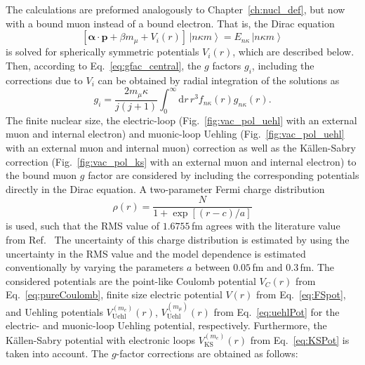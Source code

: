 The calculations are preformed analogously to Chapter~\ref{ch:nucl_def}, but now with a bound muon instead of a bound electron. That is, the Dirac equation
\begin{equation}
\label{eq:boundMuonDirac}
\left[\boldsymbol{\alpha}\cdot\mathbf{p}+
\beta m_\mu + V_i(r)\right]
\,\left|n\kappa m\right> = E_{n\kappa} \, \left|n\kappa m\right>
\end{equation}
is solved for spherically symmetric potentials $V_i(r)$, which are described below. Then, according to Eq.~\eqref{eq:gfac_central}, the $g$ factors $g_i$, including the corrections due to $V_i$ can be obtained by radial integration of the solutions as
\begin{equation}
g_i=\frac{2m_\mu\kappa}{j(j+1)}\int_0^\infty\mathrm{d}r\, r^3 f_{n\kappa}(r)g_{n\kappa}(r).
\label{eq:gfac_centralMuon}
\end{equation}
The finite nuclear size, the electric-loop (Fig.~\ref{fig:vac_pol_uehl} with an external muon and internal electron) and muonic-loop Uehling (Fig.~\ref{fig:vac_pol_uehl} with an external muon and internal muon) correction as well as the Källen-Sabry correction (Fig.~\ref{fig:vac_pol_ks} with an external muon and internal electron) to the bound muon $g$ factor are considered by including the corresponding potentials directly in the Dirac equation. A two-parameter Fermi charge distribution 
\begin{equation}
\rho(r) = \frac{N}{1+\exp\left[(r-c)/a\right]}
\end{equation}
is used, such that the RMS value of $1.6755\,$fm agrees with the literature value from Ref.~\cite{Angeli2013}
The uncertainty of this charge distribution is estimated by using the uncertainty in the RMS value and the model dependence is estimated conventionally by varying the parameters $a$ between $0.05\,$fm and $0.3\,$fm. The considered potentials are the point-like Coulomb potential $V_C(r)$ from Eq.~\eqref{eq:pureCoulomb}, finite size electric potential $V(r)$ from Eq.~\eqref{eq:FSpot}, and Uehling potentials $V^{(m_e)}_{\text{Uehl}}(r)$, $V^{(m_\mu)}_{\text{Uehl}}(r)$ from Eq.~\eqref{eq:uehlPot} for the electric- and muonic-loop Uehling potential, respectively. Furthermore, the Källen-Sabry potential with electronic loops $V^{(m_e)}_{\text{KS}}(r)$ from Eq.~\eqref{eq:KSPot} is taken into account. The $g$-factor corrections are obtained as follows:\\[10pt]
